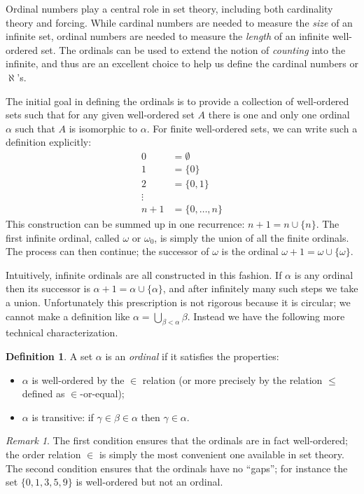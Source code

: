 \documentclass[11pt,oneside,a4paper]{amsbook}
\theoremstyle{definition}
\theoremstyle{plain}
\theoremstyle{definition}
\newtheorem{definition}[theorem]{Definition}
\theoremstyle{remark}
\newtheorem{remark}[theorem]{Remark}
\numberwithin{equation}{section}
\numberwithin{figure}{section}
\begin{document}
Ordinal numbers play a central role in set theory, including both cardinality theory and forcing. While cardinal numbers are needed to measure the \emph{size} of an infinite set, ordinal numbers are needed to measure the \emph{length} of an infinite well-ordered set. The ordinals can be used to extend the notion of \emph{counting} into the infinite, and thus are an excellent choice to help us define the cardinal numbers or $\aleph$'s.

The initial goal in defining the ordinals is to provide a collection of well-ordered sets such that for any given well-ordered set $A$ there is one and only one ordinal $\alpha$ such that $A$ is isomorphic to $\alpha$. For finite well-ordered sets, we can write such a definition explicitly:
\begin{align*}
0&=\emptyset\\
1&=\{0\}\\
2&=\{0,1\}\\
\vdots\\
n+1&=\{0,\ldots,n\}
\end{align*}
This construction can be summed up in one recurrence: $n+1=n\cup\{n\}$. The first infinite ordinal, called $\omega$ or $\omega_0$, is simply the union of all the finite ordinals. The process can then continue; the successor of $\omega$ is the ordinal $\omega+1=\omega\cup\{\omega\}$.

Intuitively, infinite ordinals are all constructed in this fashion. If $\alpha$ is any ordinal then its successor is $\alpha+1=\alpha\cup\{\alpha\}$, and after infinitely many such steps we take a union. Unfortunately this prescription is not rigorous because it is circular; we cannot make a definition like $\alpha=\bigcup_{\beta<\alpha}\beta$. Instead we have the following more technical characterization.

\begin{definition}
  \label{defn:ordinals}
  A set $\alpha$ is an \emph{ordinal} if it satisfies the properties:
  \begin{itemize}
  \item $\alpha$ is well-ordered by the $\in$ relation (or more precisely by the relation $\leq$ defined as $\in$-or-equal);
  \item $\alpha$ is transitive: if $\gamma\in\beta\in\alpha$ then $\gamma\in\alpha$.
  \end{itemize}
\end{definition}

\begin{remark}
The first condition ensures that the ordinals are in fact well-ordered; the order relation $\in$ is simply the most convenient one available in set theory. The second condition ensures that the ordinals have no ``gaps''; for instance the set $\{0,1,3,5,9\}$ is well-ordered but not an ordinal.
\end{remark}
\end{document}

